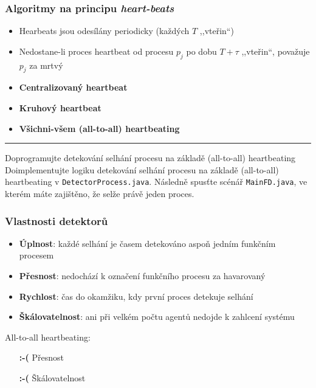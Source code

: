 \documentclass[usenames,dvipsnames,9pt]{beamer}
\begin{document}
{
\begin{frame}
  \frametitle{Algoritmy na principu \emph{heart-beats}}

  \begin{itemize}
    \item Hearbeats jsou odesílány periodicky (každých $T$ ,,vteřin``)
    \item Nedostane-li proces heartbeat od procesu $p_j$ po dobu $T+\tau$ ,,vteřin``, považuje $p_j$ za mrtvý
  \end{itemize}

  \pause
  \begin{itemize}
    \item {\bf Centralizovaný heartbeat}
    \item {\bf Kruhový heartbeat}
    \item {\bf Všichni-všem (all-to-all) heartbeating}
  \end{itemize}

  \pause\vspace{1em}\hrule\vspace{1em}

  \begin{block}{Doprogramujte detekování selhání procesu na základě (all-to-all) heartbeating}
    Doimplementujte logiku detekování selhání procesu na základě (all-to-all) heartbeating v \texttt{DetectorProcess.java}. Následně spusťte scénář \texttt{MainFD.java}, ve kterém máte zajištěno, že selže právě jeden proces.
  \end{block}

\end{frame}
}

\begin{frame}
  \frametitle{Vlastnosti detektorů}

  \begin{itemize}
    \pause\item {\bf Úplnost}: každé selhání je časem detekováno aspoň jedním funkčním procesem
    \pause\item {\bf Přesnost}: nedochází k označení funkčního procesu za havarovaný
    \pause\item {\bf Rychlost}: čas do okamžiku, kdy první proces detekuje selhání
    \pause\item {\bf Škálovatelnost}: ani při velkém počtu agentů nedojde k zahlcení systému
  \end{itemize}

  \pause
  All-to-all heartbeating:
  \begin{itemize}
    \item[\bf\textcolor{BrickRed}{:-(}] Přesnost
    \item[\bf\textcolor{BrickRed}{:-(}] Škálovatelnost
  \end{itemize}

\end{frame}
\end{document}
